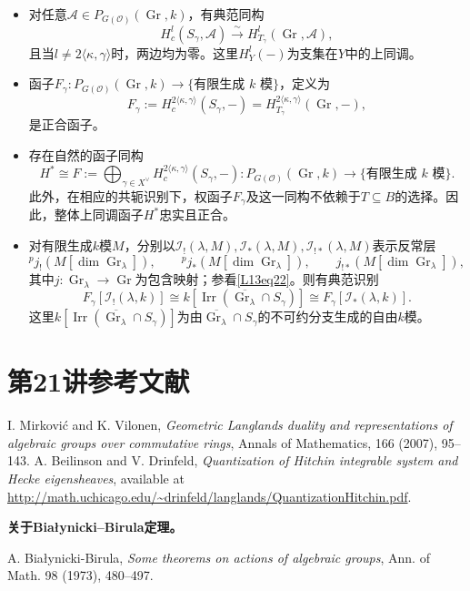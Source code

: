 \begin{itemize}
\item 对任意$\mathcal A\in P_{G(\mathcal O)}(\operatorname{Gr},k)$，有典范同构
\[H_c^l(S_\gamma,\mathcal A)\xrightarrow{\sim}H_{T_\gamma}^l(\operatorname{Gr},\mathcal A),\]
且当$l\ne2\langle\kappa,\gamma\rangle$时，两边均为零。这里$H_Y^l(-)$为支集在$Y$中的上同调。
\item 函子$F_\gamma:P_{G(\mathcal O)}(\operatorname{Gr},k)\to\{\text{有限生成 }k\text{ 模}\}$，定义为
\[F_\gamma:=H_c^{2\langle\kappa,\gamma\rangle}(S_\gamma,-)=H_{T_\gamma}^{2\langle\kappa,\gamma\rangle}(\operatorname{Gr},-),\]
是正合函子。
\item 存在自然的函子同构
\[H^*\cong F:=\bigoplus_{\gamma\in X^\vee}H_c^{2\langle\kappa,\gamma\rangle}(S_\gamma,-):P_{G(\mathcal O)}(\operatorname{Gr},k)\to\{\text{有限生成 }k\text{ 模}\}.\]
此外，在相应的共轭识别下，权函子$F_\gamma$及这一同构不依赖于$T\subseteq B$的选择。因此，整体上同调函子$H^*$忠实且正合。
\item 对有限生成$k$模$M$，分别以$\mathcal I_!(\lambda,M),\mathcal I_*(\lambda,M),\mathcal I_{!*}(\lambda,M)$表示反常层
\[{}^pj_!(M[\dim\operatorname{Gr}_\lambda]),\qquad{}^pj_*(M[\dim\operatorname{Gr}_\lambda]),\qquad j_{!*}(M[\dim\operatorname{Gr}_\lambda]),\]
其中$j:\operatorname{Gr}_\lambda\to\operatorname{Gr}$为包含映射；参看\eqref{L13eq22}。则有典范识别
\[F_\gamma[\mathcal I_!(\lambda,k)]\cong k[\operatorname{Irr}(\overline{\operatorname{Gr}_\lambda}\cap S_\gamma)]\cong F_\gamma[\mathcal I_*(\lambda,k)].\]
这里$k[\operatorname{Irr}(\overline{\operatorname{Gr}_\lambda}\cap S_\gamma)]$为由$\overline{\operatorname{Gr}_\lambda}\cap S_\gamma$的不可约分支生成的自由$k$模。
\end{itemize}
\section{第21讲参考文献}\label{L21S4}
\begin{references}
 I. Mirkovi\'c and K. Vilonen, \textit{Geometric Langlands duality and representations of algebraic groups over commutative rings}, Annals of Mathematics, 166 (2007), 95--143.
 A. Beilinson and V. Drinfeld, \textit{Quantization of Hitchin integrable system and Hecke eigensheaves}, available at \url{http://math.uchicago.edu/~drinfeld/langlands/QuantizationHitchin.pdf}.
\end{references}
\textbf{关于Białynicki–Birula定理。}
\begin{references}
 A. Bia\l ynicki-Birula, \textit{Some theorems on actions of algebraic groups}, Ann. of Math. 98 (1973), 480--497.
\end{references}
